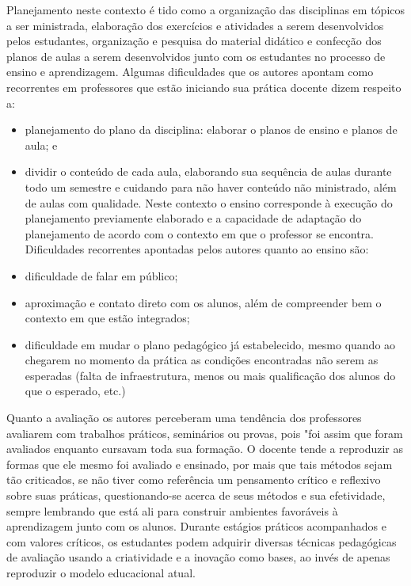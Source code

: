     
    Planejamento neste contexto é tido como a organização das disciplinas em tópicos a ser ministrada, elaboração dos exercícios e atividades a serem desenvolvidos pelos estudantes, organização e pesquisa do material didático e confecção dos planos de aulas a serem desenvolvidos junto com os estudantes no processo de ensino e aprendizagem. Algumas dificuldades que os autores apontam como recorrentes em professores que estão iniciando sua prática docente dizem respeito a:
    \begin{itemize}
	\item planejamento do plano da disciplina: elaborar o planos de ensino e planos de aula; e
	\item dividir o conteúdo de cada aula, elaborando sua sequência de aulas durante todo um semestre e cuidando para não haver conteúdo não ministrado, além de aulas com qualidade.
	Neste contexto o ensino corresponde à execução do planejamento previamente elaborado e a capacidade de adaptação do planejamento de acordo com o contexto em que o professor se encontra. Dificuldades recorrentes apontadas pelos autores quanto ao ensino são:
	\item dificuldade de falar em público; 
	\item aproximação e contato direto com os alunos, além de compreender bem o contexto em que estão integrados;
	\item dificuldade em mudar o plano pedagógico já estabelecido, mesmo quando ao chegarem no momento da prática as condições encontradas não serem as esperadas (falta de infraestrutura, menos ou mais qualificação dos alunos do que o esperado, etc.)
    \end{itemize}
	
    
    Quanto a avaliação os autores perceberam uma tendência dos professores avaliarem com trabalhos práticos, seminários ou provas, pois "foi assim que foram avaliados enquanto cursavam toda sua formação. O docente tende a reproduzir as formas que ele mesmo foi avaliado e ensinado, por mais que tais métodos sejam tão criticados, se não tiver como referência um pensamento crítico e reflexivo sobre suas práticas, questionando-se acerca de seus métodos e sua efetividade, sempre lembrando que está ali para construir ambientes favoráveis à aprendizagem junto com os alunos.  Durante estágios práticos acompanhados e com valores críticos, os estudantes podem adquirir diversas técnicas pedagógicas de avaliação usando a criatividade e a inovação como bases, ao invés de apenas reproduzir o modelo educacional atual.
	
